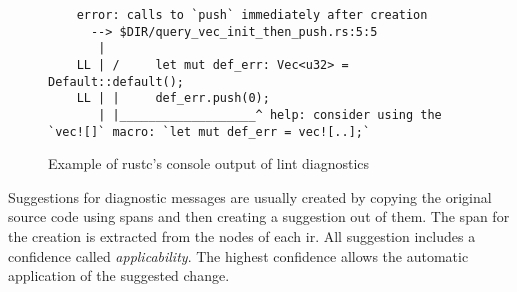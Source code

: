 \begin{figure}[H]
    \footnotesize
    \begin{verbatim}
    error: calls to `push` immediately after creation
      --> $DIR/query_vec_init_then_push.rs:5:5
       |
    LL | /     let mut def_err: Vec<u32> = Default::default();
    LL | |     def_err.push(0);
       | |___________________^ help: consider using the `vec![]` macro: `let mut def_err = vec![..];`
    \end{verbatim}
    \caption{Example of rustc's console output of lint diagnostics}
    \label{fig:plan.lint-interface.diag-console-output}
\end{figure}

Suggestions for diagnostic messages are usually created by copying the original source code using spans and then creating a suggestion out of them. The span for the creation is extracted from the nodes of each \acrshort{ir}. All suggestion includes a confidence called \emph{applicability}. The highest confidence allows the automatic application of the suggested change. \cite{rustcdev2021.diagnostic}
